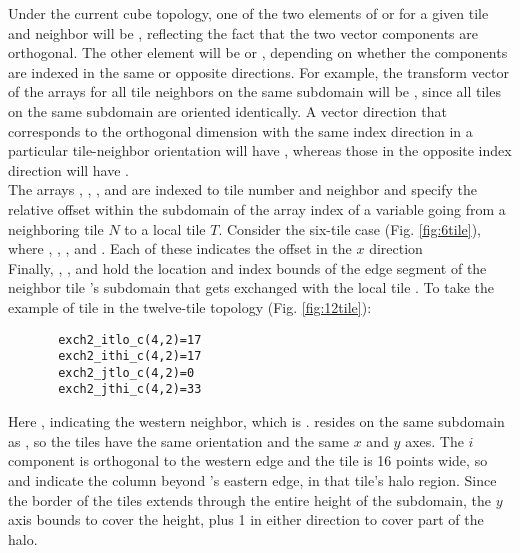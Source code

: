 Under the current cube topology, one of the two elements of
 or  for a given tile  and
neighbor  will be , reflecting the fact that the two
vector components are orthogonal.  The other element will be 
or , depending on whether the components are indexed in the
same or opposite directions.  For example, the transform vector of the
arrays for all tile neighbors on the same subdomain will be
, since all tiles on the same subdomain are oriented
identically.  A vector direction that corresponds to the orthogonal
dimension with the same index direction in a particular tile-neighbor
orientation will have , whereas those in the opposite
index direction will have . \\

The arrays ,
, , and
 are indexed to tile number and
neighbor and specify the relative offset within the subdomain of the
array index of a variable going from a neighboring tile $N$ to a local
tile $T$.  Consider the six-tile case (Fig. \ref{fig:6tile}), where
, ,
, and .  Each of these
indicates the offset in the $x$ direction \\

Finally, ,
,
 and
 hold the location and index
bounds of the edge segment of the neighbor tile 's subdomain
that gets exchanged with the local tile .  To take the example
of tile  in the twelve-tile topology
(Fig. \ref{fig:12tile}): \\

\begin{verbatim}
       exch2_itlo_c(4,2)=17
       exch2_ithi_c(4,2)=17
       exch2_jtlo_c(4,2)=0
       exch2_jthi_c(4,2)=33
\end{verbatim}
 
Here , indicating the western neighbor, which is .
 resides on the same subdomain as , so the tiles
have the same orientation and the same $x$ and $y$ axes.  The $i$
component is orthogonal to the western edge and the tile is 16 points
wide, so  and  indicate the
column beyond 's eastern edge, in that tile's halo
region. Since the border of the tiles extends through the entire
height of the subdomain, the $y$ axis bounds  to
 cover the height, plus 1 in either direction to
cover part of the halo. \\


